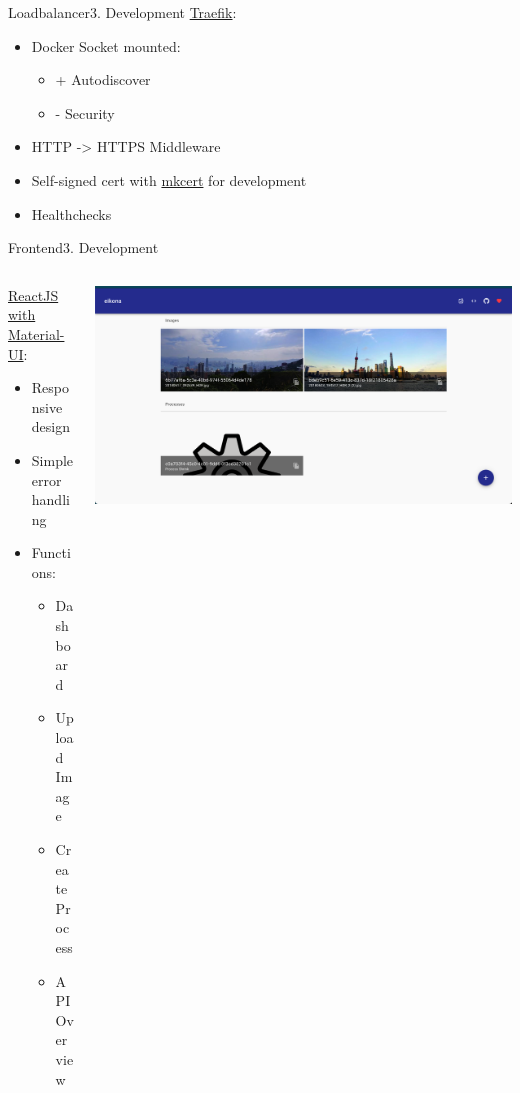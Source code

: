 \documentclass[aspectratio=169,20pt]{beamer}
\begin{document}
\begin{frame}{Loadbalancer}{3. Development}
	\underline{Traefik}:
	\begin{itemize}
		\item{Docker Socket mounted:}
		\begin{itemize}
			\item{+ Autodiscover}
			\item{- Security}
		\end{itemize}
		\item{HTTP -> HTTPS Middleware}
		\item{Self-signed cert with \href{https://github.com/FiloSottile/mkcert}{mkcert} for development}
		\item{Healthchecks}
	\end{itemize}
\end{frame}

\begin{frame}{Frontend}{3. Development}
	\begin{columns}[onlytextwidth,T]
		\begin{column}{.40\linewidth}
			\underline{ReactJS with Material-UI}:
			\vspace{1in}
			\begin{itemize}
				\item{Responsive design}
				\item{Simple error handling}
				\item{Functions:}
				\begin{itemize}
					\item{Dashboard}
					\item{Upload Image}
					\item{Create Process}
					\item{API Overview}
				\end{itemize}
			\end{itemize}
		\end{column}	
		\begin{column}{.60\linewidth}
			\includegraphics[scale=0.35]{frontend}
		\end{column}
	\end{columns}
\end{frame}
\end{document}
